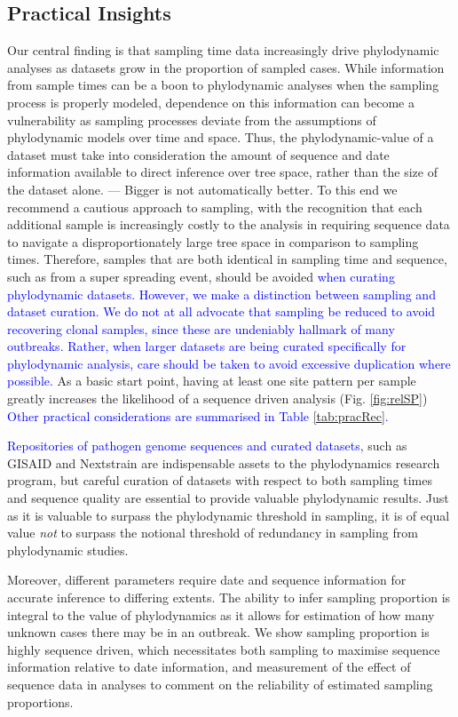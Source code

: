 \documentclass{article}
\begin{document}
\subsection*{Practical Insights}
Our central finding is that sampling time data increasingly drive phylodynamic analyses as datasets grow in the proportion of sampled cases. While information from sample times can be a boon to phylodynamic analyses when the sampling process is properly modeled, dependence on this information can become a vulnerability as sampling processes deviate from the assumptions of phylodynamic models over time and space. Thus, the phylodynamic-value of a dataset must take into consideration the amount of sequence and date information available to direct inference over tree space, rather than the size of the dataset alone. --- Bigger is not automatically better. To this end we recommend a cautious approach to sampling, with the recognition that each additional sample is increasingly costly to the analysis in requiring sequence data to navigate a disproportionately large tree space in comparison to sampling times. Therefore, samples that are both identical in sampling time and sequence, such as from a super spreading event, should be avoided \textcolor{blue}{when curating phylodynamic datasets. However, we make a distinction between sampling and dataset curation. We do not at all advocate that sampling be reduced to avoid recovering clonal samples, since these are undeniably hallmark of many outbreaks. Rather, when larger datasets are being curated specifically for phylodynamic analysis, care should be taken to avoid excessive duplication where possible.} As a basic start point, having at least one site pattern per sample greatly increases the likelihood of a sequence driven analysis (Fig. \ref{fig:relSP}) \textcolor{blue}{Other practical considerations are summarised in Table \ref{tab:pracRec}.}

\textcolor{blue}{Repositories of pathogen genome sequences and curated datasets}, such as GISAID and Nextstrain are indispensable assets to the phylodynamics research program, but careful curation of datasets with respect to both sampling times and sequence quality are essential to provide valuable phylodynamic results. Just as it is valuable to surpass the phylodynamic threshold in sampling, it is of equal value \textit{not} to surpass the notional threshold of redundancy in sampling from phylodynamic studies.

Moreover, different parameters require date and sequence information for accurate inference to differing extents. The ability to infer sampling proportion is integral to the value of phylodynamics as it allows for estimation of how many unknown cases there may be in an outbreak. We show sampling proportion is highly sequence driven, which necessitates both sampling to maximise sequence information relative to date information, and measurement of the effect of sequence data in analyses to comment on the reliability of estimated sampling proportions.
\end{document}
